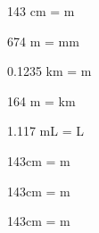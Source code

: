 \documentclass[../main.tex]{subfiles}
\begin{document}


\begin{question}
143 cm =   m
 \end{question}
\begin{question}
674 m =   mm
 \end{question}
\begin{question}
0.1235 km =   m
 \end{question}
\begin{question}
164 m =   km
 \end{question}
\begin{question}
1.117 mL =   L
 \end{question}
\begin{question}
143cm =  m
 \end{question}
\begin{question}
143cm =  m
 \end{question}
\begin{question}
143cm =  m
 \end{question}
\end{document}
